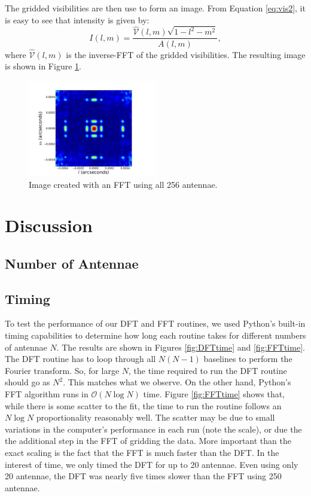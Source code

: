 \documentclass[11pt,letterpaper]{article}
\begin{document}
The gridded visibilities are then use to form an image.  From Equation 
\ref{eq:vis2}, it is easy to see that intensity is given by:
\begin{equation}
I(l,m)=\frac{\hat{\mathcal{V}}(l,m)\sqrt{1-l^2-m^2}}{A(l,m)},
\end{equation}
where $\hat{\mathcal{V}}(l,m)$ is the inverse-FFT of the gridded 
visibilities.  The resulting image is shown in Figure \ref{fig:fft}.

\begin{figure}[!h]
\centering
\includegraphics[width=0.5\textwidth]{FFT_Image.pdf}
\caption{Image created with an FFT using all 256 antennae.}
\label{fig:fft}
\end{figure}


\section{Discussion}
\subsection{Number of Antennae}

\subsection{Timing}
To test the performance of our DFT and FFT routines, we used Python's built-in 
timing capabilities to determine how long each routine takes for different 
numbers of antennae $N$.  The results are shown in Figures \ref{fig:DFTtime} and 
\ref{fig:FFTtime}.  The DFT routine has to loop through all $N(N-1)$ baselines 
to perform the Fourier transform.  So, for large $N$, the time required to 
run the DFT routine should go as $N^2$.  This matches what we observe.  On the 
other hand, Python's FFT algorithm runs in $\mathcal{O}(N\log N)$ time.  Figure 
\ref{fig:FFTtime} shows that, while there is some scatter to the fit, the time 
to run the routine follows an $N\log N$ proportionality reasonably well.  
The scatter may be due to small variations in the computer's performance in 
each run (note the scale), or due the the additional step in the FFT of 
gridding the data.  More important than the exact scaling is the fact that 
the FFT is much faster than the DFT.  In the interest of time, we only timed 
the DFT for up to 20 antennae.  Even using only 20 antennae, the DFT was nearly 
five times slower than the FFT using 250 antennae.
\end{document}
